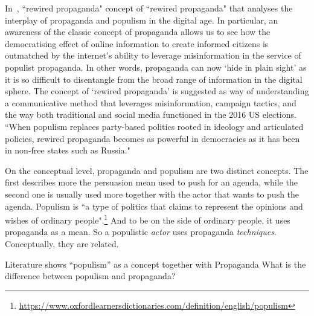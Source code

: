 In~\citet{oates2021rewired}, ``rewired propaganda"
concept of ``rewired propaganda" that analyses the interplay of propaganda and populism in the digital age. In particular, an awareness of the classic concept of propaganda allows us to see how the democratising effect of online information to create informed citizens is outmatched by the internet’s ability to leverage misinformation in the service of populist propaganda.
In other words, propaganda can now ‘hide in plain sight’ as it is so difficult to disentangle from the broad range of information in the digital sphere.
The concept of ‘rewired propaganda’ is suggested as way of understanding a communicative method that leverages misinformation, campaign tactics, and the way both traditional and social media functioned in the 2016 US elections.
``When populism replaces party-based politics rooted in ideology and articulated policies, rewired propaganda becomes as powerful in democracies as it has been in non-free states such as Russia."


On the conceptual level, propaganda and populism are two distinct concepts. The first describes more the persuasion mean used to push for an agenda, while the second one is usually used more together with the actor that wants to push the agenda. Populism is ``a type of politics that claims to represent the opinions and wishes of ordinary people".\footnote{\url{https://www.oxfordlearnersdictionaries.com/definition/english/populism}}
And to be on the side of ordinary people, it uses propaganda as a mean. So a populistic \emph{actor} uses propaganda \emph{techniques}. Conceptually, they are related.


Literature shows “populism” as a concept together with Propaganda
What is the difference between populism and propaganda?

